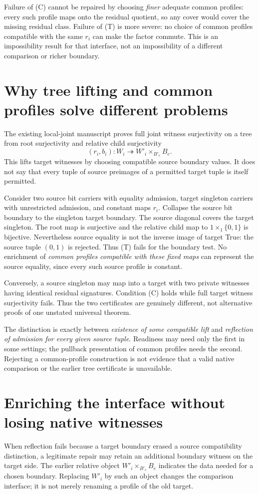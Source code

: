 \documentclass[11pt]{article}
\begin{document}
Failure of (C) cannot be repaired by choosing \emph{finer} adequate common profiles: every such profile maps onto the residual quotient, so any cover would cover the missing residual class. Failure of (T) is more severe: no choice of common profiles compatible with the same $r_i$ can make the factor commute. This is an impossibility result for that interface, not an impossibility of a different comparison or richer boundary.

\section{Why tree lifting and common profiles solve different problems}
The existing local-joint manuscript proves full joint witness surjectivity on a tree from root surjectivity and relative child surjectivity
\[
 (r_i,b_i):W_i\twoheadrightarrow W'_i\times_{B'_e}B_e.
\]
This lifts target witnesses by choosing compatible source boundary values. It does not say that every tuple of source preimages of a permitted target tuple is itself permitted.

Consider two source bit carriers with equality admission, target singleton carriers with unrestricted admission, and constant maps $r_i$. Collapse the source bit boundary to the singleton target boundary. The source diagonal covers the target singleton. The root map is surjective and the relative child map to $1\times_1\{0,1\}$ is bijective. Nevertheless source equality is not the inverse image of target True: the source tuple $(0,1)$ is rejected. Thus (T) fails for the boundary test. No enrichment of \emph{common profiles compatible with these fixed maps} can represent the source equality, since every such source profile is constant.

Conversely, a source singleton may map into a target with two private witnesses having identical residual signatures. Condition (C) holds while full target witness surjectivity fails. Thus the two certificates are genuinely different, not alternative proofs of one unstated universal theorem.

The distinction is exactly between \emph{existence of some compatible lift} and \emph{reflection of admission for every given source tuple}. Readiness may need only the first in some settings; the pullback presentation of common profiles needs the second. Rejecting a common-profile construction is not evidence that a valid native comparison or the earlier tree certificate is unavailable.

\section{Enriching the interface without losing native witnesses}
When reflection fails because a target boundary erased a source compatibility distinction, a legitimate repair may retain an additional boundary witness on the target side. The earlier relative object $W'_i\times_{B'_e}B_e$ indicates the data needed for a chosen boundary. Replacing $W'_i$ by such an object changes the comparison interface; it is not merely renaming a profile of the old target.
\end{document}
